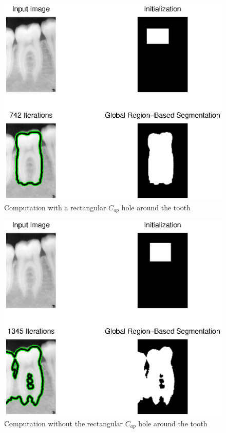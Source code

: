 \begin{figure}[H]
\centering
\includegraphics[scale=0.7]{images/with_hole_rx2.eps}
\caption{Computation with a rectangular $C_{ap}$ hole around the tooth}
\label{with_hole}
\end{figure}

\begin{figure}[H]
\centering
\includegraphics[scale=0.7]{images/without_hole_rx2.eps}
\caption{Computation without the rectangular $C_{ap}$ hole around the tooth}
\label{without_hole}
\end{figure}

